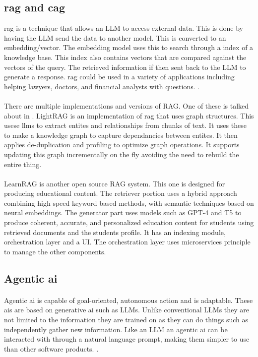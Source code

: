 \subsection{\acrfull{rag} and \acrfull{cag}}
\acrshort{rag} is a technique that allows an LLM to access external data. This is done by having the LLM send the data to another model. This is converted to an embedding/vector. The embedding model uses this to search through a index of a knowledge base. This index also contains vectors that are compared against the vectors of the query. The retrieved information if then sent back to the LLM to generate a response. \acrshort{rag} could be used in a variety of applications including helping lawyers, doctors, and financial analysts with questions. \autocite{merritt_what_2025}.

\paragraph{}There are multiple implementations and versions of RAG. One of these is talked about in \cite{shan_learnrag_2025}. LightRAG is an implementation of \acrshort{rag} that uses graph structures. This usese \acrshort{llm}s to extract entites and relationships from chunks of text. It uses these to make a knowledge graph to capture dependancies between entites. It then applies de-duplication and profiling to optimize graph operations. It supports updating this graph incrementally on the fly avoiding the need to rebuild the entire thing.

\paragraph{}LearnRAG is another open source RAG system. This one is designed for producing educational content. The retriever portion uses a hybrid approach combining high speed keyword based methods, with semantic techniques based on neural embeddings. The generator part uses models such as GPT-4 and T5 to produce coherent, accurate, and personalized education content for students using retrieved documents and the students profile. It has an indexing module, orchestration layer and a UI. The orchestration layer uses microservices principle to manage the other components.\autocite{shan_learnrag_2025}

\subsection{Agentic \acrshort{ai}}
\paragraph{}Agentic \acrshort{ai} is capable of goal-oriented, autonomous action and is adaptable. These \acrshort{ai}s are based on generative \acrshort{ai} such as LLMs. Unlike conventional LLMs they are not limited to the information they are trained on as they can do things such as independently gather new information. Like an LLM an agentic \acrshort{ai} can be interacted with through a natural language prompt, making them simpler to use than other software products. \autocite{noauthor_what_2025}.

